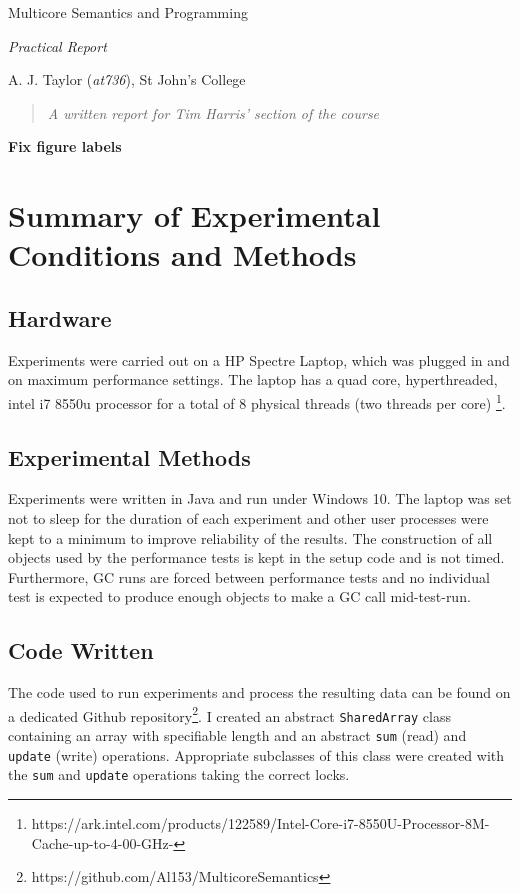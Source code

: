 \documentclass[11pt]{article}
\newcommand{\todo}[1]{\textbf{#1}}
\begin{document}
\centerline{\Large Multicore Semantics and Programming}
\vspace{2em}
\centerline{\Large \emph{Practical Report}}
\vspace{2em}
\centerline{\large A. J. Taylor (\emph{at736}), St John's College}
\vspace{1em}

\begin{abstract}
\textsl{
	A written report for Tim Harris' section of the course
} 
\end{abstract}


\todo{Fix figure labels}

\section{Summary of Experimental Conditions and Methods}

\subsection{Hardware}
Experiments were carried out on a HP Spectre Laptop, which was plugged in and on maximum performance settings. The laptop has a quad core, hyperthreaded, intel i7 8550u processor for a total of 8 physical threads (two threads per core) \footnote{https://ark.intel.com/products/122589/Intel-Core-i7-8550U-Processor-8M-Cache-up-to-4-00-GHz-}.

\subsection{Experimental Methods}
Experiments were written in Java and run under Windows 10. The laptop was set not to sleep for the duration of each experiment and other user processes were kept to a minimum to improve reliability of the results. The construction of all objects used by the performance tests is kept in the setup code and is not timed. Furthermore, GC runs are forced between performance tests and no individual test is expected to produce enough objects to make a GC call mid-test-run.

\subsection{Code Written}
The code used to run experiments and process the resulting data can be found on a dedicated Github repository\footnote{https://github.com/Al153/MulticoreSemantics}. I created an abstract \texttt{SharedArray} class containing an array with specifiable length and an abstract \texttt{sum} (read) and \texttt{update} (write) operations. Appropriate subclasses of this class were created with the \texttt{sum} and \texttt{update} operations taking the correct locks.
\end{document}
